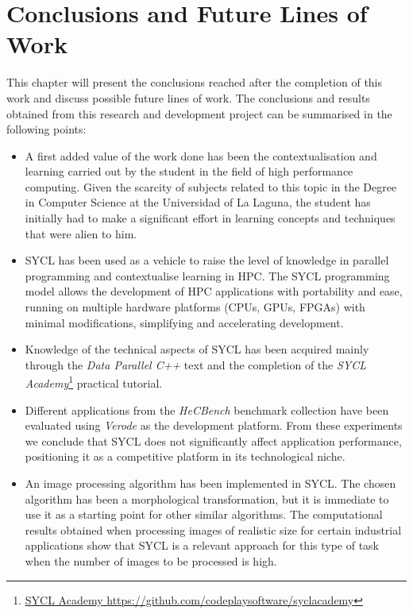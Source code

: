 %
%
%

\chapter{Conclusions and Future Lines of Work} \label{chap:Conclusions} 


This chapter will present the conclusions reached after the completion of this work and discuss possible future lines of work.
The conclusions and results obtained from this research and development project can be summarised in the following points:

\begin{itemize}
    \item A first added value of the work done has been the contextualisation and learning carried out by the student in the field of high performance computing. Given the scarcity of subjects related to this topic in the Degree in Computer Science at the Universidad of La Laguna, the student has initially had to make a significant effort in learning concepts and techniques that were alien to him.
    
    \item SYCL has been used as a vehicle to raise the level of knowledge in parallel programming and contextualise learning in HPC. The SYCL programming model allows the development of HPC applications with portability and ease, running on multiple hardware platforms (CPUs, GPUs, FPGAs) with minimal modifications, simplifying and accelerating development.
    
    \item Knowledge of the technical aspects of SYCL has been acquired mainly through the \textit{Data Parallel C++} \cite{Reinders:2023:Data} text and the completion of the \textit{SYCL Academy}\footnote{\href{https://github.com/codeplaysoftware/syclacademy}{{SYCL Academy} \url{https://github.com/codeplaysoftware/syclacademy}}} practical tutorial.
    
    \item Different applications from the \textit{HeCBench} benchmark collection have been evaluated using \textit{Verode} as the development platform. From these experiments we conclude that SYCL does not significantly affect application performance, positioning it as a competitive platform in its technological niche.
    
    \item An image processing algorithm has been implemented in SYCL. The chosen algorithm has been a morphological transformation, but it is immediate to use it as a starting point for other similar algorithms.
    The computational results obtained when processing images of realistic size for certain industrial applications show that SYCL is a relevant approach for this type of task when the number of images to be processed is high.
    
\end{itemize}

